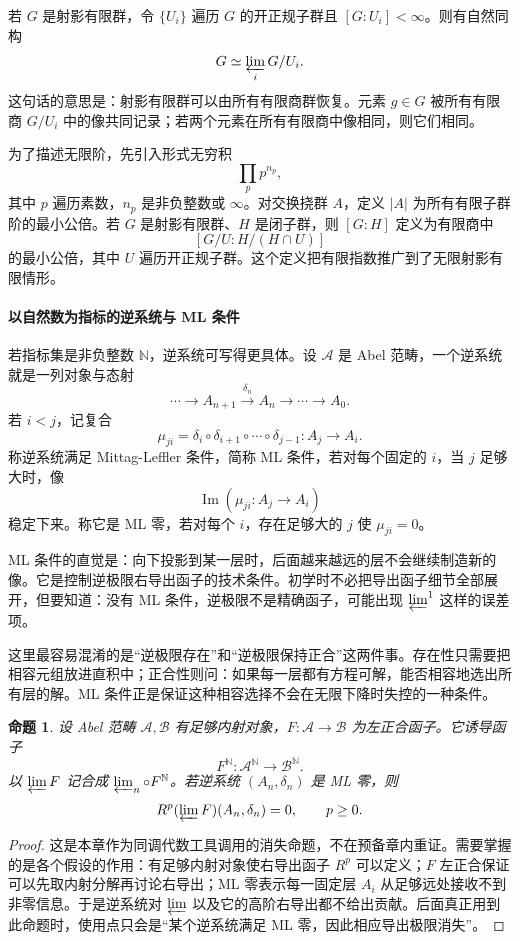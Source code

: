 \documentclass[11pt,a4paper,openany]{ctexbook}
\numberwithin{equation}{chapter}
\newcommand{\N}{\mathbb{N}}
\theoremstyle{plain}
\newtheorem{proposition}[theorem]{命题}
\theoremstyle{definition}
\theoremstyle{remark}
\begin{document}
若 $G$ 是射影有限群，令 $\{U_i\}$ 遍历 $G$ 的开正规子群且 $[G:U_i]<\infty$。则有自然同构
\[
G\simeq \varprojlim_i G/U_i.
\]
这句话的意思是：射影有限群可以由所有有限商群恢复。元素 $g\in G$ 被所有有限商 $G/U_i$ 中的像共同记录；若两个元素在所有有限商中像相同，则它们相同。

为了描述无限阶，先引入形式无穷积
\[
\prod_p p^{n_p},
\]
其中 $p$ 遍历素数，$n_p$ 是非负整数或 $\infty$。对交换挠群 $A$，定义 $|A|$ 为所有有限子群阶的最小公倍。若 $G$ 是射影有限群、$H$ 是闭子群，则 $[G:H]$ 定义为有限商中
\[
[G/U:H/(H\cap U)]
\]
的最小公倍，其中 $U$ 遍历开正规子群。这个定义把有限指数推广到了无限射影有限情形。

\paragraph{以自然数为指标的逆系统与 ML 条件}
若指标集是非负整数 $\N$，逆系统可写得更具体。设 $\mathcal A$ 是 Abel 范畴，一个逆系统就是一列对象与态射
\[
\cdots\longrightarrow A_{n+1}\xrightarrow{\delta_n}A_n\longrightarrow\cdots\longrightarrow A_0.
\]
若 $i<j$，记复合
\[
\mu_{ji}=\delta_i\circ\delta_{i+1}\circ\cdots\circ\delta_{j-1}:A_j\to A_i.
\]
称逆系统满足 Mittag-Leffler 条件，简称 ML 条件，若对每个固定的 $i$，当 $j$ 足够大时，像
\[
\operatorname{Im}(\mu_{ji}:A_j\to A_i)
\]
稳定下来。称它是 ML 零，若对每个 $i$，存在足够大的 $j$ 使 $\mu_{ji}=0$。

ML 条件的直觉是：向下投影到某一层时，后面越来越远的层不会继续制造新的像。它是控制逆极限右导出函子的技术条件。初学时不必把导出函子细节全部展开，但要知道：没有 ML 条件，逆极限不是精确函子，可能出现 $\varprojlim^1$ 这样的误差项。

这里最容易混淆的是“逆极限存在”和“逆极限保持正合”这两件事。存在性只需要把相容元组放进直积中；正合性则问：如果每一层都有方程可解，能否相容地选出所有层的解。ML 条件正是保证这种相容选择不会在无限下降时失控的一种条件。

\begin{proposition}
设 Abel 范畴 $\mathcal A,\mathcal B$ 有足够内射对象，$F:\mathcal A\to\mathcal B$ 为左正合函子。它诱导函子
\[
F^\N:\mathcal A^\N\longrightarrow \mathcal B^\N.
\]
以 $\varprojlim F$ 记合成 $\varprojlim_n\circ F^\N$。若逆系统 $(A_n,\delta_n)$ 是 ML 零，则
\[
R^p(\varprojlim F)(A_n,\delta_n)=0,\qquad p\ge0.
\]
\end{proposition}

\begin{proof}
这是本章作为同调代数工具调用的消失命题，不在预备章内重证。需要掌握的是各个假设的作用：有足够内射对象使右导出函子 $R^p$ 可以定义；$F$ 左正合保证可以先取内射分解再讨论右导出；ML 零表示每一固定层 $A_i$ 从足够远处接收不到非零信息。于是逆系统对 $\varprojlim$ 以及它的高阶右导出都不给出贡献。后面真正用到此命题时，使用点只会是“某个逆系统满足 ML 零，因此相应导出极限消失”。
\end{proof}
\end{document}

